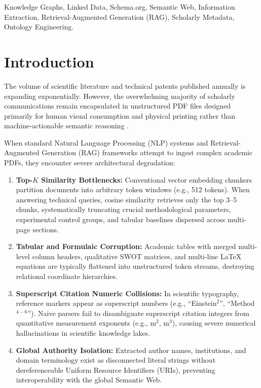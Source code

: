 \documentclass[conference]{IEEEtran}
\begin{document}
\begin{IEEEkeywords}
Knowledge Graphs, Linked Data, Schema.org, Semantic Web, Information Extraction, Retrieval-Augmented Generation (RAG), Scholarly Metadata, Ontology Engineering.
\end{IEEEkeywords}

\section{Introduction}

The volume of scientific literature and technical patents published annually is expanding exponentially. However, the overwhelming majority of scholarly communications remain encapsulated in unstructured PDF files designed primarily for human visual consumption and physical printing rather than machine-actionable semantic reasoning \cite{berners2001semantic}. 

When standard Natural Language Processing (NLP) systems and Retrieval-Augmented Generation (RAG) frameworks attempt to ingest complex academic PDFs, they encounter severe architectural degradation:
\begin{enumerate}
    \item \textbf{Top-$K$ Similarity Bottlenecks:} Conventional vector embedding chunkers partition documents into arbitrary token windows (e.g., 512 tokens). When answering technical queries, cosine similarity retrieves only the top 3--5 chunks, systematically truncating crucial methodological parameters, experimental control groups, and tabular baselines dispersed across multi-page sections.
    \item \textbf{Tabular and Formulaic Corruption:} Academic tables with merged multi-level column headers, qualitative SWOT matrices, and multi-line LaTeX equations are typically flattened into unstructured token streams, destroying relational coordinate hierarchies.
    \item \textbf{Superscript Citation Numeric Collisions:} In scientific typography, reference markers appear as superscript numbers (e.g., ``Einstein$^2$'', ``Method$^{4-6}$''). Naive parsers fail to disambiguate superscript citation integers from quantitative measurement exponents (e.g., $\text{m}^2$, $\text{m}^3$), causing severe numerical hallucinations in scientific knowledge lakes.
    \item \textbf{Global Authority Isolation:} Extracted author names, institutions, and domain terminology exist as disconnected literal strings without dereferenceable Uniform Resource Identifiers (URIs), preventing interoperability with the global Semantic Web.
\end{enumerate}
\end{document}
